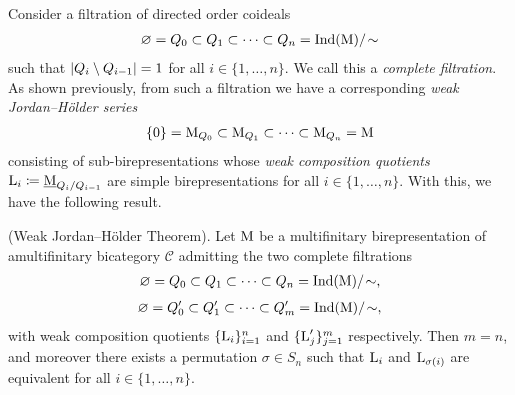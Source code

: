 \noindent Consider a filtration of directed order coideals
\begin{align*}
\begin{split}
\varnothing = Q_0 \subset Q_1 \subset \cdots \subset Q_n = \textnormal{Ind}(\textnormal{M})/\!\sim
\end{split}
\end{align*}
\noindent such that $\lvert Q_i \setminus Q_{i-1}\rvert = 1$ for all $i \in \{1, \dots, n\}$. We call this a {\em complete filtration}. As shown previously, from such a filtration we have a corresponding {\em weak Jordan--H\"{o}lder series}
\begin{align*}
\begin{split}
\{0\} = \textnormal{M}_{Q_0} \subset \textnormal{M}_{Q_1} \subset \cdots \subset \textnormal{M}_{Q_n} = \textnormal{M}
\end{split}
\end{align*}
\noindent consisting of sub-birepresentations whose {\em weak composition quotients} $\textnormal{L}_i \coloneqq \underline{\textnormal{M}}_{Q_i/Q_{i-1}}$ are simple birepresentations for all $i \in \{1, \dots, n\}$. With this, we have the following result.\\

\noindent\begin{theorem}\textnormal{(Weak Jordan--H\"{o}lder Theorem).} Let $\textnormal{M}$ be a multifinitary birepresentation of a\linebreak multifinitary bicategory $\mathscr{C}$ admitting the two complete filtrations
\begin{align*}
\begin{split}
\varnothing = Q_0 \subset Q_1 \subset \cdots \subset Q_n = \textnormal{Ind}(\textnormal{M})/\!\sim,%
\end{split}
\end{align*}
\begin{align*}
\begin{split}
\varnothing = Q_0' \subset Q_1' \subset \cdots \subset Q_m' = \textnormal{Ind}(\textnormal{M})/\!\sim,
\end{split}
\end{align*}
\noindent with weak composition quotients $\{\textnormal{L}_i\}_{i=1}^n$ and $\{\textnormal{L}_j'\}_{j=1}^m$ respectively. Then $m = n$, and moreover there exists a permutation $\sigma \in S_n$ such that $\textnormal{L}_i$ and $\textnormal{L}_{\sigma(i)}$ are equivalent for all $i \in \{1, \dots, n\}$.\\
\end{theorem}

